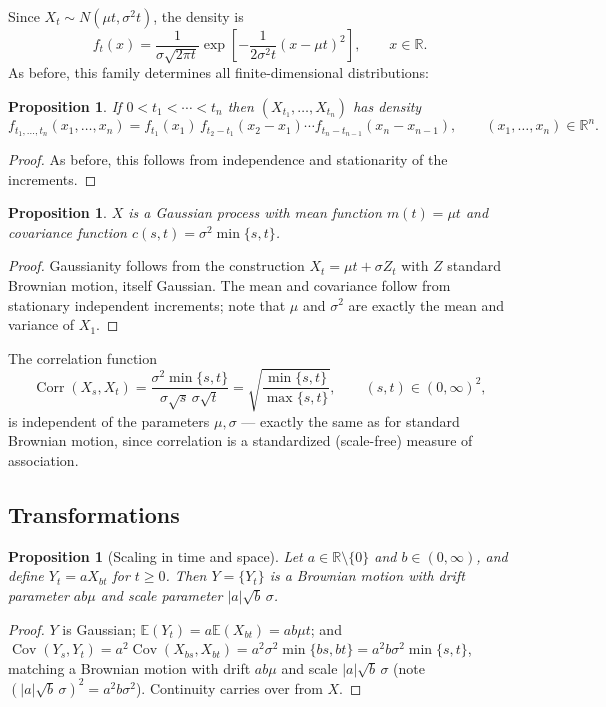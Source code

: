 \documentclass[12pt,openany]{book}
\newtheorem{proposition}[theorem]{Proposition}
\theoremstyle{definition}
\theoremstyle{remark}
\newcommand{\R}{\mathbb{R}}
\newcommand{\E}{\mathbb{E}}
\DeclareMathOperator{\Cov}{Cov}
\DeclareMathOperator{\cor}{Corr}
\begin{document}
Since $X_t \sim N(\mu t, \sigma^2 t)$, the density is
\begin{equation}
    f_t(x) = \frac{1}{\sigma\sqrt{2\pi t}}\exp\!\left[-\frac{1}{2\sigma^2 t}(x-\mu t)^2\right], \qquad x\in\R. \tag{18.2.2}
\end{equation}
As before, this family determines all finite-dimensional distributions:
\begin{proposition}
If $0<t_1<\cdots<t_n$ then $(X_{t_1},\dots,X_{t_n})$ has density
\begin{equation}
    f_{t_1,\dots,t_n}(x_1,\dots,x_n) = f_{t_1}(x_1)\,f_{t_2-t_1}(x_2-x_1)\cdots f_{t_n-t_{n-1}}(x_n-x_{n-1}), \qquad (x_1,\dots,x_n)\in\R^n. \tag{18.2.3}
\end{equation}
\end{proposition}
\begin{proof}
As before, this follows from independence and stationarity of the increments.
\end{proof}
 
\begin{proposition}
$X$ is a Gaussian process with mean function $m(t)=\mu t$ and covariance function $c(s,t) = \sigma^2\min\{s,t\}$.
\end{proposition}
\begin{proof}
Gaussianity follows from the construction $X_t = \mu t + \sigma Z_t$ with $Z$ standard Brownian motion, itself Gaussian. The mean and covariance follow from stationary independent increments; note that $\mu$ and $\sigma^2$ are exactly the mean and variance of $X_1$.
\end{proof}
 
The correlation function
\begin{equation}
    \cor(X_s,X_t) = \frac{\sigma^2\min\{s,t\}}{\sigma\sqrt s\, \sigma\sqrt t} = \sqrt{\frac{\min\{s,t\}}{\max\{s,t\}}}, \qquad (s,t)\in(0,\infty)^2, \tag{18.2.4}
\end{equation}
is independent of the parameters $\mu,\sigma$ — exactly the same as for standard Brownian motion, since correlation is a standardized (scale-free) measure of association.
 
\subsection{Transformations}
 
\begin{proposition}[Scaling in time and space]
Let $a\in\R\setminus\{0\}$ and $b\in(0,\infty)$, and define $Y_t = aX_{bt}$ for $t\ge 0$. Then $Y=\{Y_t\}$ is a Brownian motion with drift parameter $ab\mu$ and scale parameter $|a|\sqrt b\,\sigma$.
\end{proposition}
\begin{proof}
$Y$ is Gaussian; $\E(Y_t) = a\E(X_{bt}) = ab\mu t$; and $\Cov(Y_s,Y_t) = a^2\Cov(X_{bs},X_{bt}) = a^2\sigma^2\min\{bs,bt\} = a^2b\sigma^2\min\{s,t\}$, matching a Brownian motion with drift $ab\mu$ and scale $|a|\sqrt b\,\sigma$ (note $(|a|\sqrt b\,\sigma)^2 = a^2 b \sigma^2$). Continuity carries over from $X$.
\end{proof}
 
\end{document}

